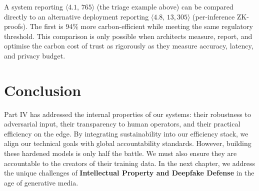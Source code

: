 A system reporting $\langle 4.1,\, 765 \rangle$ (the triage
example above) can be compared directly to an alternative
deployment reporting $\langle 4.8,\, 13{,}305 \rangle$ (per-inference
ZK-proofs).
The first is 94\% more carbon-efficient while meeting the same
regulatory threshold.
This comparison is only possible when architects measure, report,
and optimise the carbon cost of trust as rigorously as they
measure accuracy, latency, and privacy budget.

\section{Conclusion}
\label{sec:conclusion_efficiency}

Part IV has addressed the internal properties of our systems: their robustness to adversarial input, their transparency to human operators, and their practical efficiency on the edge. By integrating sustainability into our efficiency stack, we align our technical goals with global accountability standards. However, building these hardened models is only half the battle. We must also ensure they are accountable to the creators of their training data. In the next chapter, we address the unique challenges of \textbf{Intellectual Property and Deepfake Defense} in the age of generative media.
